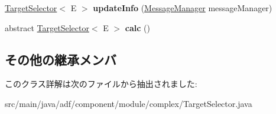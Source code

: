 \begin{DoxyCompactItemize}
\hypertarget{classadf_1_1component_1_1module_1_1complex_1_1TargetSelector_a91278e0b3b662efd8617e96309248942}{}\label{classadf_1_1component_1_1module_1_1complex_1_1TargetSelector_a91278e0b3b662efd8617e96309248942} 
\hyperlink{classadf_1_1component_1_1module_1_1complex_1_1TargetSelector}{Target\+Selector}$<$ E $>$ {\bfseries update\+Info} (\hyperlink{classadf_1_1agent_1_1communication_1_1MessageManager}{Message\+Manager} message\+Manager)
\item 
\hypertarget{classadf_1_1component_1_1module_1_1complex_1_1TargetSelector_a1e776672858945c16604c7e7e2e8eafe}{}\label{classadf_1_1component_1_1module_1_1complex_1_1TargetSelector_a1e776672858945c16604c7e7e2e8eafe} 
abstract \hyperlink{classadf_1_1component_1_1module_1_1complex_1_1TargetSelector}{Target\+Selector}$<$ E $>$ {\bfseries calc} ()
\end{DoxyCompactItemize}
\subsection*{その他の継承メンバ}


このクラス詳解は次のファイルから抽出されました\+:\begin{DoxyCompactItemize}
\item 
src/main/java/adf/component/module/complex/Target\+Selector.\+java\end{DoxyCompactItemize}
